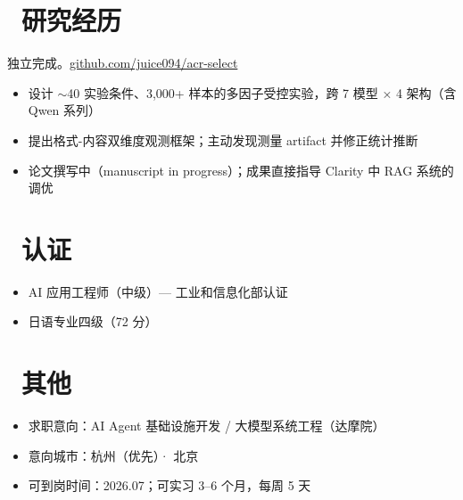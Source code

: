 \documentclass{resume}
\begin{document}
\section{\faFlask\ 研究经历}
独立完成。\href{https://github.com/juice094/acr-select}{github.com/juice094/acr-select}
\begin{itemize}
  \item 设计 $\sim$40 实验条件、3,000+ 样本的多因子受控实验，跨 7 模型 × 4 架构（含 Qwen 系列）
  \item 提出格式-内容双维度观测框架；主动发现测量 artifact 并修正统计推断
  \item 论文撰写中（manuscript in progress）；成果直接指导 Clarity 中 RAG 系统的调优
\end{itemize}

\section{\faCertificate\ 认证}
\begin{itemize}[parsep=0.5ex]
  \item AI 应用工程师（中级）--- 工业和信息化部认证
  \item 日语专业四级（72 分）
\end{itemize}

\section{\faInfo\ 其他}
\begin{itemize}[parsep=0.5ex]
  \item 求职意向：AI Agent 基础设施开发 / 大模型系统工程（达摩院）
  \item 意向城市：杭州（优先）· 北京
  \item 可到岗时间：2026.07；可实习 3--6 个月，每周 5 天
\end{itemize}
\end{document}
